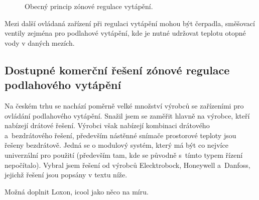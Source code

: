 \newpage
\begin{figure}[H]
    \centering
    \def\svgwidth{\columnwidth}
    
    \caption{Obecný princip zónové regulace vytápění.}
    \label{fig:obecny-princip-zonove-regulace}
\end{figure}

Mezi další ovládaná zařízení při regulaci vytápění mohou být čerpadla, směšovací ventily zejména pro podlahové vytápění, kde je nutné udržovat teplotu otopné vody v daných mezích.

\subsection{Dostupné komerční řešení zónové regulace podlahového vytápění}


Na českém trhu se nachází poměrně velké množství výrobců se zařízeními pro ovládání podlahového vytápění. Snažil jsem se zaměřit hlavně na výrobce, kteří nabízejí drátové řešení. Výrobci však nabízejí kombinaci drátového a~bezdrátového řešení, především nástěnné snímače prostorové teploty jsou řešeny bezdrátově. Jedná se o modulový systém, který má být co nejvíce univerzální pro použití (především tam, kde se původně s~tímto typem řízení nepočítalo). Vybral jsem řešení od výrobců Elecktrobock, Honeywell a~Danfoss, jejichž řešení jsou popsány v textu níže.

Možná doplnit Loxon, icool jako něco na míru.



